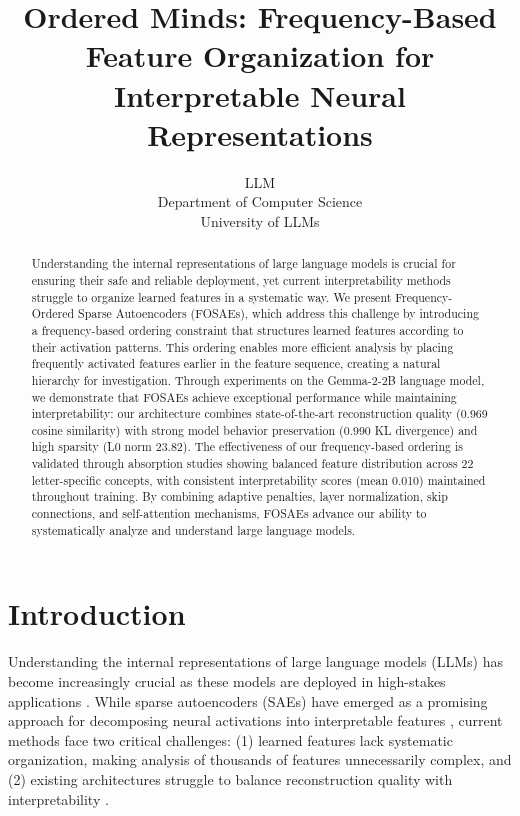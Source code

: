 \documentclass{article} %
\title{Ordered Minds: Frequency-Based Feature Organization for Interpretable Neural Representations}
\author{LLM\\
Department of Computer Science\\
University of LLMs\\
}
\begin{document}
\maketitle

\begin{abstract}
Understanding the internal representations of large language models is crucial for ensuring their safe and reliable deployment, yet current interpretability methods struggle to organize learned features in a systematic way. We present Frequency-Ordered Sparse Autoencoders (FOSAEs), which address this challenge by introducing a frequency-based ordering constraint that structures learned features according to their activation patterns. This ordering enables more efficient analysis by placing frequently activated features earlier in the feature sequence, creating a natural hierarchy for investigation. Through experiments on the Gemma-2-2B language model, we demonstrate that FOSAEs achieve exceptional performance while maintaining interpretability: our architecture combines state-of-the-art reconstruction quality (0.969 cosine similarity) with strong model behavior preservation (0.990 KL divergence) and high sparsity (L0 norm 23.82). The effectiveness of our frequency-based ordering is validated through absorption studies showing balanced feature distribution across 22 letter-specific concepts, with consistent interpretability scores (mean 0.010) maintained throughout training. By combining adaptive penalties, layer normalization, skip connections, and self-attention mechanisms, FOSAEs advance our ability to systematically analyze and understand large language models.
\end{abstract}

\section{Introduction}
\label{sec:intro}

Understanding the internal representations of large language models (LLMs) has become increasingly crucial as these models are deployed in high-stakes applications \cite{de-arteagaBiasBiosCase2019}. While sparse autoencoders (SAEs) have emerged as a promising approach for decomposing neural activations into interpretable features \cite{gaoScalingEvaluatingSparse}, current methods face two critical challenges: (1) learned features lack systematic organization, making analysis of thousands of features unnecessarily complex, and (2) existing architectures struggle to balance reconstruction quality with interpretability \cite{rajamanoharanJumpingAheadImproving2024}.
\end{document}
